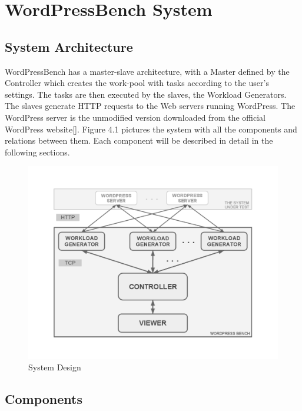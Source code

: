 \chapter{WordPressBench System}
\label{chapter:chapter4}


\section{System Architecture}
\label{sub-sec:system-architecture}

WordPressBench has a master-slave architecture, with a Master defined by the Controller which creates the work-pool with tasks according to the user's settings. The tasks are then executed by the slaves, the Workload Generators. The slaves generate HTTP requests to the Web servers running WordPress. The WordPress server is the unmodified version downloaded from the official WordPress website[]. Figure 4.1 pictures the system with all the components and relations between them. Each component will be described in detail in the following sections.

  \begin{figure}[htb]
    \begin{center}
    \includegraphics[trim=2.5cm 2.5cm 2.5cm 2.5cm, clip=true, scale=0.65]{src/img/WordPressBench.pdf}
    \caption{System Design}
    \end{center}
  \end{figure}


\section{Components}
\label{sec:components}

